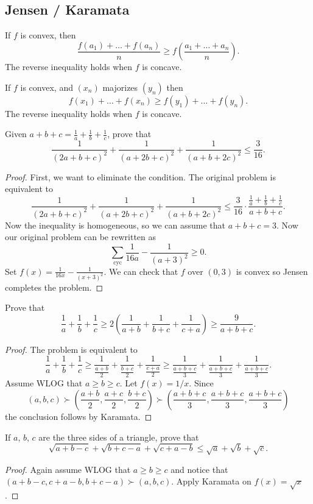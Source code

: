 \documentclass[11pt]{scrartcl}
\begin{document}
\subsection{Jensen / Karamata}
\begin{theorem}
   If $f$ is convex, then
  \[ \frac{f(a_1) + \dots + f(a_n)}{n} \ge f\left( \frac{a_1+\dots+a_n}{n} \right). \]
  The reverse inequality holds when $f$ is concave.
\end{theorem}
\begin{theorem}
   If $f$ is convex, and $(x_n)$ majorizes $(y_n)$ then
  \[ f(x_1) + \dots + f(x_n) \ge f(y_1) + \dots + f(y_n). \]
  The reverse inequality holds when $f$ is concave.
\end{theorem}
\begin{example}
  [Shortlist 2009] Given $a+b+c=\frac1a+\frac1b+\frac1c$, prove that
  \[ \frac{1}{(2a+b+c)^2}+\frac{1}{(a+2b+c)^2}+\frac{1}{(a+b+2c)^2}\leq\frac{3}{16}. \]
\end{example}
\begin{proof}
  First, we want to eliminate the condition.
  The original problem is equivalent to
  \[ \frac{1}{(2a+b+c)^2}+\frac{1}{(a+2b+c)^2}+\frac{1}{(a+b+2c)^2}\leq\frac{3}{16} \cdot \frac{\frac1a+\frac1b+\frac1c}{a+b+c}. \]
  Now the inequality is homogeneous, so we can assume that $a+b+c=3$.
  Now our original problem can be rewritten as
  \[ \sum_{\text{cyc}} \frac{1}{16a} - \frac{1}{(a+3)^2} \ge 0. \]
  Set $f(x) = \frac{1}{16x} - \frac{1}{(x+3)^2}$.
  We can check that $f$ over $(0,3)$ is convex so Jensen completes the problem.
\end{proof}
\begin{example}
  Prove that \[ \frac{1}{a}+\frac{1}{b}+\frac{1}{c} \geq
    2\left(\frac{1}{a+b}+\frac{1}{b+c}+\frac{1}{c+a}\right)
    \geq\frac{9}{a+b+c}. \]
\end{example}
\begin{proof}
  The problem is equivalent to
  \[ \frac{1}{a} + \frac{1}{b} + \frac{1}{c}
    \ge \frac{1}{\frac{a+b}{2}} + \frac{1}{\frac{b+c}{2}} + \frac{1}{\frac{c+a}{2}}
    \ge \frac{1}{\frac{a+b+c}{3}} + \frac{1}{\frac{a+b+c}{3}} + \frac{1}{\frac{a+b+c}{3}}. \]
  Assume WLOG that $a \ge b \ge c$. Let $f(x) = 1/x$. Since
  \[ (a,b,c) \succ \left( \frac{a+b}{2}, \frac{a+c}{2}, \frac{b+c}{2} \right) \succ \left( \frac{a+b+c}{3}, \frac{a+b+c}{3}, \frac{a+b+c}{3} \right) \]
  the conclusion follows by Karamata.
\end{proof}
\begin{example}
  [APMO 1996] If $a$, $b$, $c$ are the three sides of a triangle,
  prove that \[ \sqrt{a+b-c}+\sqrt{b+c-a}+\sqrt{c+a-b}\leq\sqrt{a}+\sqrt{b}+\sqrt{c}. \]
\end{example}
\begin{proof}
  Again assume WLOG that $a \ge b \ge c$ and notice that $(a+b-c,c+a-b,b+c-a) \succ (a,b,c)$.
  Apply Karamata on $f(x) = \sqrt x$.
\end{proof}
\end{document}
